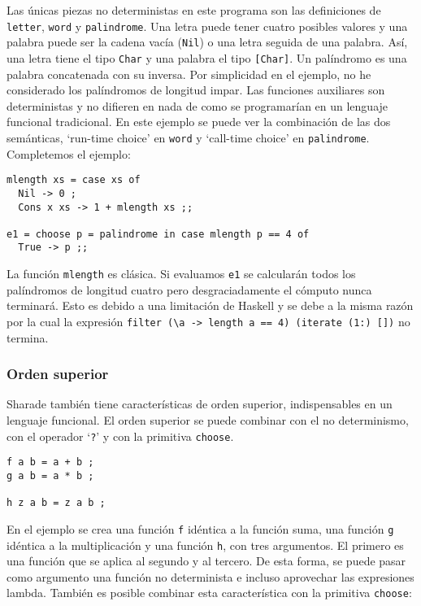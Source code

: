 \documentclass[class=article, crop=false]{standalone}
\begin{document}
Las únicas piezas no deterministas en este programa son las definiciones de \verb`letter`,
\verb`word` y \verb`palindrome`. Una letra puede tener cuatro posibles valores y una palabra
puede ser la cadena vacía (\verb`Nil`) o una letra seguida de una palabra. Así, una letra
tiene el tipo \verb`Char` y una palabra el tipo \verb`[Char]`. Un palíndromo es una palabra
concatenada con su inversa. Por simplicidad en el ejemplo, no he considerado los palíndromos
de longitud impar. Las funciones auxiliares son deterministas y no difieren en nada de como
se programarían en un lenguaje funcional tradicional. En este ejemplo se puede ver la
combinación de las dos semánticas, `run-time choice' en \verb`word` y `call-time
choice' en \verb`palindrome`. Completemos el ejemplo:

\begin{verbatim}
mlength xs = case xs of
  Nil -> 0 ;
  Cons x xs -> 1 + mlength xs ;;

e1 = choose p = palindrome in case mlength p == 4 of
  True -> p ;;
\end{verbatim}

La función \verb`mlength` es clásica. Si evaluamos \verb`e1` se calcularán todos los
palíndromos de longitud cuatro pero desgraciadamente el cómputo nunca terminará. Esto es
debido a una limitación de Haskell y se debe a la misma razón por la cual la expresión
\verb`filter (\a -> length a == 4) (iterate (1:) [])` no termina.

\subsubsection{Orden superior}

Sharade también tiene características de orden superior, indispensables en un lenguaje
funcional. El orden superior se puede combinar con el no determinismo, con el operador
`\verb`?`' y con la primitiva \verb`choose`.

\begin{verbatim}
f a b = a + b ;
g a b = a * b ;

h z a b = z a b ;
\end{verbatim}

En el ejemplo se crea una función \verb`f` idéntica a la función suma, una función \verb`g`
idéntica a la multiplicación y una función \verb`h`, con tres argumentos. El primero es una
función que se aplica al segundo y al tercero. De esta forma, se puede pasar como argumento
una función no determinista e incluso aprovechar las expresiones lambda. También es posible
combinar esta característica con la primitiva \verb`choose`:
\end{document}
